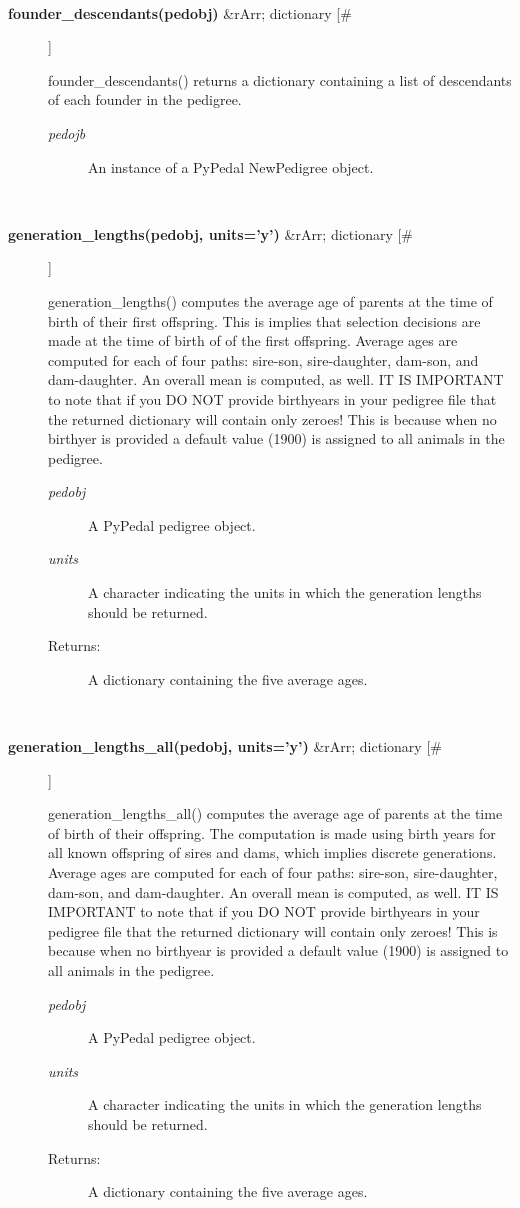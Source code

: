 \documentclass[10pt]{article}
\begin{document}
\begin{description}
\begin{description}
\end{description}
\\ 

\item[\textbf{founder\_descendants(pedobj)}
 \&rArr; dictionary [\#]]

 founder\_descendants() returns a dictionary containing a list of descendants of each founder in the pedigree.
\begin{description}
\item[\emph{pedojb}
] An instance of a PyPedal NewPedigree object.

\end{description}
\\ 

\item[\textbf{generation\_lengths(pedobj, units='y')}
 \&rArr; dictionary [\#]]

 generation\_lengths() computes the average age of parents at the time of birth of their first offspring. This is implies that selection decisions are made at the time of birth of of the first offspring. Average ages are computed for each of four paths: sire-son, sire-daughter, dam-son, and dam-daughter. An overall mean is computed, as well. IT IS IMPORTANT to note that if you DO NOT provide birthyears in your pedigree file that the returned dictionary will contain only zeroes! This is because when no birthyer is provided a default value (1900) is assigned to all animals in the pedigree.
\begin{description}
\item[\emph{pedobj}
] A PyPedal pedigree object.
\item[\emph{units}
] A character indicating the units in which the generation lengths should be returned.
\item[Returns:] A dictionary containing the five average ages.

\end{description}
\\ 

\item[\textbf{generation\_lengths\_all(pedobj, units='y')}
 \&rArr; dictionary [\#]]

 generation\_lengths\_all() computes the average age of parents at the time of birth of their offspring. The computation is made using birth years for all known offspring of sires and dams, which implies discrete generations. Average ages are computed for each of four paths: sire-son, sire-daughter, dam-son, and dam-daughter. An overall mean is computed, as well. IT IS IMPORTANT to note that if you DO NOT provide birthyears in your pedigree file that the returned dictionary will contain only zeroes! This is because when no birthyear is provided a default value (1900) is assigned to all animals in the pedigree.
\begin{description}
\item[\emph{pedobj}
] A PyPedal pedigree object.
\item[\emph{units}
] A character indicating the units in which the generation lengths should be returned.
\item[Returns:] A dictionary containing the five average ages.


\end{description}
\end{description}
\end{document}
